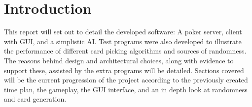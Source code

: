 \section{Introduction}
This report will set out to detail the developed software: A poker server,
client with GUI, and a simplistic AI\@. Test programs were also developed
to illustrate the performance of different card picking algorithms and sources
of randomness. The reasons behind design and architectural choices, along with 
evidence to support these, assisted by the extra programs will be detailed. 
Sections covered will be the current progression of the project according to
the previously created time plan, the gameplay, the GUI interface, and an in 
depth look at randomness and card generation.
